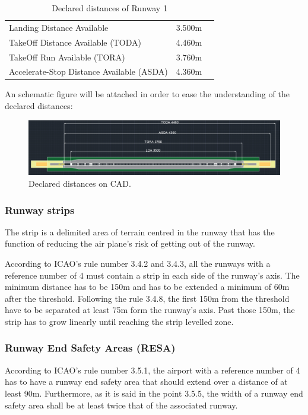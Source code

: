 			\begin{table}[htb]
				\centering
				\begin{tabular}{ll p{5cm}}
					\midrule[2pt]
					Landing Distance Available & 3.500m\\
					TakeOff Distance Available (TODA) & 4.460m\\
					TakeOff Run Available (TORA)& 3.760m \\
					Accelerate-Stop Distance Available (ASDA)& 4.360m\\
					\bottomrule[2pt]
				\end{tabular}
				\caption{Declared distances of  Runway 1}
				\label{DeclareddistancesRW1}
			\end{table}
			
			An schematic figure will be attached in order to ease the understanding of the declared distances:
			
			\begin{figure}[H]
				\centering
				\includegraphics[clip, trim=0cm 0cm 0cm 0cm, width=1\textwidth]{./images/declareddistances/pista}
				\caption{Declared distances on CAD.} %
				\label{} %
			\end{figure}
			
			\subsubsection{Runway strips}
			The strip is a delimited area of terrain centred in the runway that has the function of reducing the air plane's risk of getting out of the runway.
			
			According to ICAO's rule number 3.4.2 and 3.4.3, all the runways with a reference number of 4 must contain a strip in each side of the runway's axis. The minimum distance has to be 150m and has to be extended a minimum of 60m after the threshold. 
			Following the rule 3.4.8, the first 150m from the threshold have to be separated at least 75m form the runway's axis. Past those 150m, the strip has to grow linearly until reaching the strip levelled zone.      
			
			\subsubsection{Runway End Safety Areas (RESA)}
			According to ICAO's rule number 3.5.1, the airport with a reference number of 4 has to have a runway end safety area that should extend over a distance of at least 90m. Furthermore, as it is said in the point 3.5.5, the width of a runway end safety area shall be at least twice that of the associated runway. 
			
